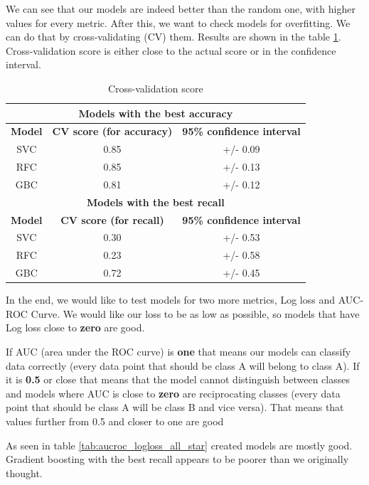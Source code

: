 \documentclass[a4paper]{article}
\begin{document}
We can see that our models are indeed better than the random one, with higher values for  every metric. After this, we want to check models for overfitting. We can do that by cross-validating (CV) them. Results are shown in the table \ref{tab:cross_val_all_star}. Cross-validation score is either close to the actual score or in the confidence interval.

\begin{table}[!h]
\begin{center}
\begin{tabular}{|c|c|c|} \hline
\multicolumn{3}{|c|}{\textbf{Models with the best accuracy}} \\ \hline
\textbf{Model} & \textbf{CV score (for accuracy)} & \textbf{95\% confidence interval} \\ \hline
SVC & 0.85 & +/- 0.09 \\ \hline
RFC & 0.85 & +/- 0.13 \\ \hline
GBC & 0.81 & +/- 0.12 \\ \hline
\multicolumn{3}{|c|}{\textbf{Models with the best recall}} \\ \hline
\textbf{Model} & \textbf{CV score (for recall)} & \textbf{95\% confidence interval} \\ \hline
SVC & 0.30 & +/- 0.53 \\ \hline
RFC & 0.23 & +/- 0.58 \\ \hline
GBC & 0.72 & +/- 0.45 \\ \hline
\end{tabular}
\caption{Cross-validation score}
\label{tab:cross_val_all_star}
\end{center}
\end{table}

In the end, we would like to test models for two more metrics, Log loss and AUC-ROC Curve. We would like our loss to be as low as possible, so models that have Log loss close to \textbf{zero} are good. \cite{logLoss} 

If AUC (area under the ROC curve) is \textbf{one} that means our models can classify data correctly (every data point that should be class A will belong to class A). If it is \textbf{0.5} or close that means that the model cannot distinguish between classes and models where AUC is close to \textbf{zero} are reciprocating classes (every data point that should be class A will be class B and vice versa). That means that values further from 0.5 and closer to one are good \cite{aucRoc}

As seen in table \ref{tab:aucroc_logloss_all_star} created models are mostly good. Gradient boosting with the best recall appears to be poorer than we originally thought. 
\end{document}
